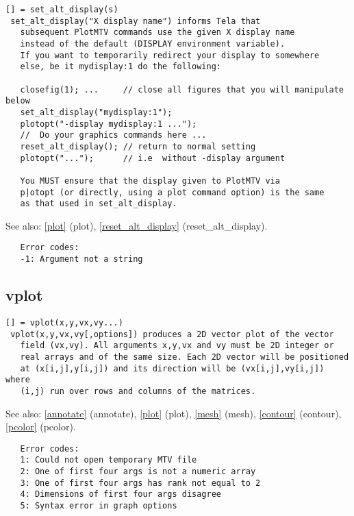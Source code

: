 \documentclass[a4paper]{article}
\begin{document}
\begin{tscreen}
\begin{verbatim}
[] = set_alt_display(s)
 set_alt_display("X display name") informs Tela that
   subsequent PlotMTV commands use the given X display name
   instead of the default (DISPLAY environment variable).
   If you want to temporarily redirect your display to somewhere
   else, be it mydisplay:1 do the following:

   closefig(1); ...     // close all figures that you will manipulate below
   set_alt_display("mydisplay:1");
   plotopt("-display mydisplay:1 ...");
   //  Do your graphics commands here ...
   reset_alt_display(); // return to normal setting
   plotopt("...");      // i.e  without -display argument

   You MUST ensure that the display given to PlotMTV via
   p|otopt (or directly, using a plot command option) is the same
   as that used in set_alt_display.
\end{verbatim}

See also: \ref{plot} {(plot)}, \ref{reset_alt_display} {(reset\_alt\_display)}.
\begin{verbatim}
   Error codes:
   -1: Argument not a string
\end{verbatim}
\end{tscreen}



\subsection{vplot\label{vplot}}

\begin{tscreen}
\begin{verbatim}
[] = vplot(x,y,vx,vy...)
 vplot(x,y,vx,vy[,options]) produces a 2D vector plot of the vector
   field (vx,vy). All arguments x,y,vx and vy must be 2D integer or
   real arrays and of the same size. Each 2D vector will be positioned
   at (x[i,j],y[i,j]) and its direction will be (vx[i,j],vy[i,j]) where
   (i,j) run over rows and columns of the matrices.
\end{verbatim}

See also: \ref{annotate} {(annotate)}, \ref{plot} {(plot)}, \ref{mesh} {(mesh)}, \ref{contour} {(contour)}, \ref{pcolor} {(pcolor)}.
\begin{verbatim}
   Error codes:
   1: Could not open temporary MTV file
   2: One of first four args is not a numeric array
   3: One of first four args has rank not equal to 2
   4: Dimensions of first four args disagree
   5: Syntax error in graph options 
\end{verbatim}
\end{tscreen}
\end{document}

